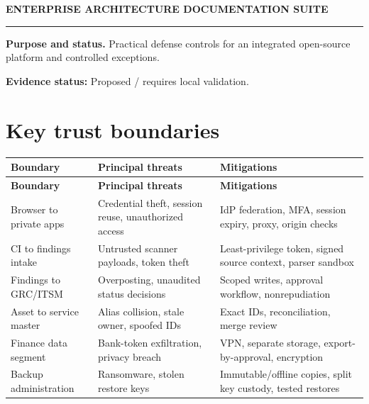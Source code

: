 \documentclass[10pt,letterpaper]{article}
\begin{document}
\begin{center}
{\large\bfseries\color{teal} ENTERPRISE ARCHITECTURE DOCUMENTATION SUITE}\par
{}\par
{}\par
\end{center}
\vspace{8pt}\hrule\vspace{12pt}
\textbf{Purpose and status.} Practical defense controls for an integrated open-source platform and controlled exceptions.\par
\textbf{Evidence status:} Proposed / requires local validation.\par
\section{Key trust boundaries}
\small\begin{longtable}{>{\raggedright\arraybackslash}p{}>{\raggedright\arraybackslash}p{}>{\raggedright\arraybackslash}p{}}
\toprule
\textbf{Boundary} & \textbf{Principal threats} & \textbf{Mitigations}\\
\midrule\endfirsthead
\toprule
\textbf{Boundary} & \textbf{Principal threats} & \textbf{Mitigations}\\
\midrule\endhead
Browser to private apps & Credential theft, session reuse, unauthorized access & IdP federation, MFA, session expiry, proxy, origin checks\\
CI to findings intake & Untrusted scanner payloads, token theft & Least-privilege token, signed source context, parser sandbox\\
Findings to GRC/ITSM & Overposting, unaudited status decisions & Scoped writes, approval workflow, nonrepudiation\\
Asset to service master & Alias collision, stale owner, spoofed IDs & Exact IDs, reconciliation, merge review\\
Finance data segment & Bank-token exfiltration, privacy breach & VPN, separate storage, export-by-approval, encryption\\
Backup administration & Ransomware, stolen restore keys & Immutable/offline copies, split key custody, tested restores\\
\bottomrule
\end{longtable}
\normalsize
\end{document}
